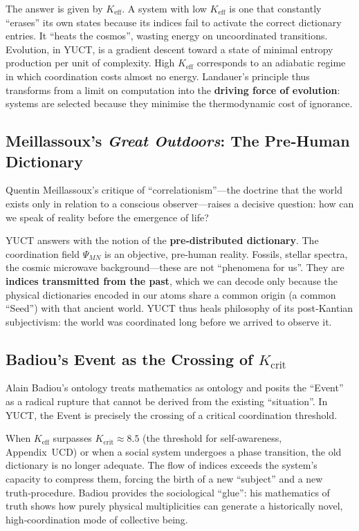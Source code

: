 \documentclass[12pt,a4paper]{article}
\newcommand{\Keff}{K_{\mathrm{eff}}}
\begin{document}
	The answer is given by \(\Keff\). A system with low \(\Keff\) is one that constantly ``erases'' its own states because its indices fail to activate the correct dictionary entries. It ``heats the cosmos'', wasting energy on uncoordinated transitions. Evolution, in YUCT, is a gradient descent toward a state of minimal entropy production per unit of complexity. High \(\Keff\) corresponds to an adiabatic regime in which coordination costs almost no energy. Landauer’s principle thus transforms from a limit on computation into the \textbf{driving force of evolution}: systems are selected because they minimise the thermodynamic cost of ignorance.
	
	\subsection{Meillassoux’s \emph{Great Outdoors}: The Pre‑Human Dictionary}
	
	Quentin Meillassoux’s critique of ``correlationism''—the doctrine that the world exists only in relation to a conscious observer—raises a decisive question: how can we speak of reality before the emergence of life?
	
	YUCT answers with the notion of the \textbf{pre‑distributed dictionary}. The coordination field \(\Psi_{MN}\) is an objective, pre‑human reality. Fossils, stellar spectra, the cosmic microwave background---these are not ``phenomena for us''. They are \textbf{indices transmitted from the past}, which we can decode only because the physical dictionaries encoded in our atoms share a common origin (a common ``Seed'') with that ancient world. YUCT thus heals philosophy of its post‑Kantian subjectivism: the world was coordinated long before we arrived to observe it.
	
	\subsection{Badiou’s Event as the Crossing of \(K_{\mathrm{crit}}\)}
	
	Alain Badiou’s ontology treats mathematics as ontology and posits the ``Event'' as a radical rupture that cannot be derived from the existing ``situation''. In YUCT, the Event is precisely the crossing of a critical coordination threshold.
	
	When \(\Keff\) surpasses \(K_{\mathrm{crit}} \approx 8.5\) (the threshold for self‑awareness, Appendix~UCD) or when a social system undergoes a phase transition, the old dictionary is no longer adequate. The flow of indices exceeds the system’s capacity to compress them, forcing the birth of a new ``subject'' and a new truth‑procedure. Badiou provides the sociological ``glue'': his mathematics of truth shows how purely physical multiplicities can generate a historically novel, high‑coordination mode of collective being.
	
\end{document}
